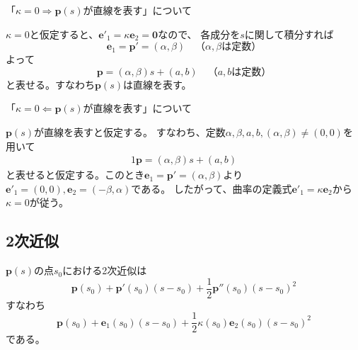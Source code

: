 \documentclass[a4j,disablejfam,dvipdfmx,papersize,slide,uplatex,21pt]{jsarticle}
\makeatletter
\renewenvironment{proof}[1][\proofname]{\par
        \pushQED{\qed}
        \normalfont
        \topsep6\p@\@plus6\p@ \trivlist
        \item[\hskip\labelsep{\bfseries #1}\@addpunct{\bfseries}]\ignorespaces
    }{%
        \popQED\endtrivlist\@endpefalse
    }
\renewcommand{\proofname}{証明.}
\makeatother
\begin{document}
\newpage
\begin{proof}
    「$\kappa = 0 \Rightarrow \text{$\bm{p}(s)$が直線を表す}$」について

    $\kappa = 0$と仮定すると、$\bm{e}'_1 = \kappa \bm{e}_2 = \bm{0}$なので、
    各成分を$s$に関して積分すれば
    \begin{equation}
        \bm{e}_1 = \bm{p}' = (\alpha, \beta) \quad \text{（$\alpha, \beta$は定数）}
    \end{equation}
    よって
    \begin{equation}
        \bm{p} = (\alpha, \beta) s + (a, b) \quad \text{（$a, b$は定数）}
    \end{equation}
    と表せる。すなわち$\bm{p}(s)$は直線を表す。

    \newpage

    「$\kappa = 0 \Leftarrow \text{$\bm{p}(s)$が直線を表す}$」について

    $\bm{p}(s)$が直線を表すと仮定する。
    すなわち、定数$\alpha, \beta, a, b, (\alpha, \beta) \neq (0, 0)$を用いて
    \begin{alignat}{1}
        \bm{p} = (\alpha, \beta) s + (a, b)
    \end{alignat}
    と表せると仮定する。このとき$\bm{e}_1 = \bm{p}' = (\alpha, \beta)$より
    $\bm{e}'_1 = (0, 0), \bm{e}_2 = (-\beta, \alpha)$である。
    したがって、曲率の定義式$\bm{e}'_1 = \kappa \bm{e}_2$から
    $\kappa = 0$が従う。
\end{proof}

\newpage
\subsection*{2次近似}
$\bm{p}(s)$の点$s_0$における2次近似は
\begin{equation}
    \bm{p}(s_0) + \bm{p}'(s_0) (s - s_0) + \frac{1}{2} \bm{p}''(s_0) (s - s_0)^2
\end{equation}
すなわち
\begin{equation}
    \bm{p}(s_0) + \bm{e}_1(s_0) (s - s_0) + \frac{1}{2} \kappa(s_0) \bm{e}_2(s_0) (s - s_0)^2
\end{equation}
である。

\newpage
\end{document}
